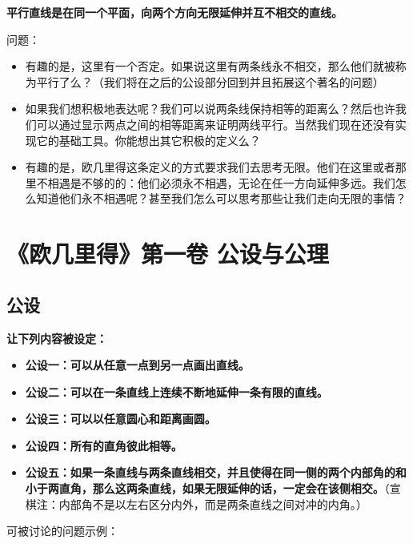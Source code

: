 \documentclass[
]{book}
\begin{document}
\textbf{平行直线是在同一个平面，向两个方向无限延伸并互不相交的直线。}

问题：

\begin{itemize}
\item
  有趣的是，这里有一个否定。如果说这里有两条线永不相交，那么他们就被称为平行了么？（我们将在之后的公设部分回到并且拓展这个著名的问题）
\item
  如果我们想积极地表达呢？我们可以说两条线保持相等的距离么？然后也许我们可以通过显示两点之间的相等距离来证明两线平行。当然我们现在还没有实现它的基础工具。你能想出其它积极的定义么？
\item
  有趣的是，欧几里得这条定义的方式要求我们去思考无限。他们在这里或者那里不相遇是不够的的：他们必须永不相遇，无论在任一方向延伸多远。我们怎么知道他们永不相遇呢？甚至我们怎么可以思考那些让我们走向无限的事情？
\end{itemize}

\hypertarget{ux6b27ux51e0ux91ccux5f97ux7b2cux4e00ux5377-ux516cux8bbeux4e0eux516cux7406}{%
\chapter{《欧几里得》第一卷 公设与公理}\label{ux6b27ux51e0ux91ccux5f97ux7b2cux4e00ux5377-ux516cux8bbeux4e0eux516cux7406}}

\hypertarget{ux516cux8bbe}{%
\section{公设}\label{ux516cux8bbe}}

\textbf{让下列内容被设定：}

\begin{itemize}
\item
  \textbf{公设一：可以从任意一点到另一点画出直线。}
\item
  \textbf{公设二：可以在一条直线上连续不断地延伸一条有限的直线。}
\item
  \textbf{公设三：可以以任意圆心和距离画圆。}
\item
  \textbf{公设四：所有的直角彼此相等。}
\item
  \textbf{公设五：如果一条直线与两条直线相交，并且使得在同一侧的两个内部角的和小于两直角，那么这两条直线，如果无限延伸的话，一定会在该侧相交。}（宣棋注：内部角不是以左右区分内外，而是两条直线之间对冲的内角。）
\end{itemize}

可被讨论的问题示例：
\end{document}
